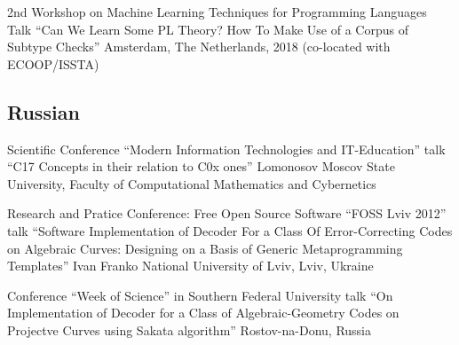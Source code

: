 \documentclass[11pt,a4paper]{moderncv}   %
\newcommand{\CPP}
{C\nolinebreak[4]\hspace{-.05em}\raisebox{.35ex}{\scriptsize\bfseries +\hspace{-.05em}+}}
\newcommand{\MyHrefImpl}[2]{%
\textcolor{blue}{\href{#1}{#2}}}
\def\LINKS{}
\newcommand*{\myhref}[2]{%
\ignorespaces%
\ifdefined\LINKS%
\MyHrefImpl{#1}{#2}%
\else%
#2%
\fi%
}
\begin{document}
%
    {2nd Workshop on Machine Learning Techniques for Programming Languages}%
    {Talk ``Can We Learn Some PL Theory? How To Make Use of a Corpus of Subtype Checks''}
    {Amsterdam, The Netherlands, 2018 (co-located with ECOOP/ISSTA)}{}%
    {%
    }

{\footnotesize
\subsection{Russian}

%
    {Scientific Conference “Modern Information Technologies and IT-Education”}%
    {talk “\protect\CPP{}17 Concepts in their relation to \protect\CPP{}0x ones”}
    {Lomonosov Moscov State University, Faculty of Computational Mathematics and Cybernetics}{}%
    {%
    }

%
    {Research and Pratice Conference: Free Open Source Software “FOSS Lviv 2012”}%
    {talk “Software Implementation of Decoder For a Class Of Error-Correcting Codes on Algebraic Curves: Designing on a Basis of Generic Metaprogramming Templates”}%
    {Ivan Franko National University of Lviv, Lviv, Ukraine}{}%
    {%
    }

%
    {Conference “Week of Science” in Southern Federal University}%
    {talk “On Implementation of Decoder for a Class of Algebraic-Geometry Codes on Projectve Curves using Sakata algorithm”}%
    {Rostov-na-Donu, Russia}{}%
    {%
    }
}

\clearpage
\end{document}
